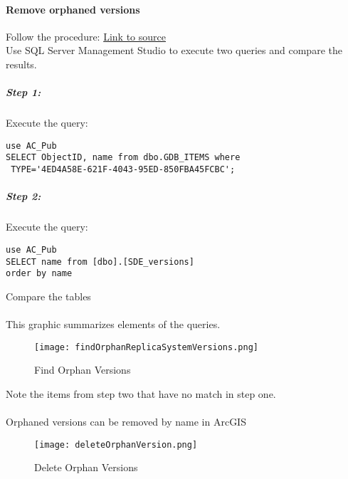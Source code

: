 \documentclass[class=article , crop=false, titlepage, twoside, multi={itemize, figure, verbatim}, float=false]{standalone}
\begin{document}
\paragraph[Remove orphaned versions]{Remove orphaned versions \texorpdfstring{\\}{}}
Follow the procedure:
\href{https://support.esri.com/en/technical-article/000010858}{Link to source}\\
Use SQL Server Management Studio to execute two queries and compare the results.
\subparagraph*{Step 1: \texorpdfstring{\\}{}}
Execute the query:
\begin{verbatim}
use AC_Pub
SELECT ObjectID, name from dbo.GDB_ITEMS where
 TYPE='4ED4A58E-621F-4043-95ED-850FBA45FCBC';
\end{verbatim}
\subparagraph*{Step 2: \texorpdfstring{\\}{}}
Execute the query:
\begin{verbatim}
use AC_Pub
SELECT name from [dbo].[SDE_versions]
order by name

\end{verbatim}
Compare the tables
\paragraph*{}This graphic summarizes elements of the queries.
\begin{figure}[h!]
\centering
    \texttt{[image: findOrphanReplicaSystemVersions.png]}
\caption{Find Orphan Versions}
\end{figure}
Note the items from step two that have no match in step one.
\clearpage

\paragraph*{}Orphaned versions can be removed by name in ArcGIS
\begin{figure}[h!]
\centering
    \texttt{[image: deleteOrphanVersion.png]}
\caption{Delete Orphan Versions}
\end{figure}
\clearpage
\end{document}
